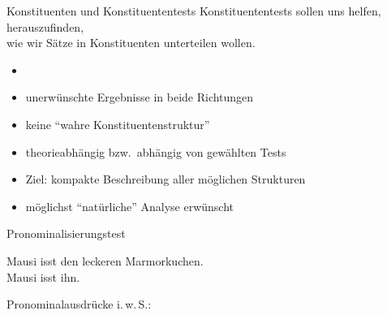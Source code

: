 \begin{frame}
  {Konstituenten und Konstituententests}
  \pause
  {\Large \alert{Konstituententests sollen uns helfen, herauszufinden,\\
  wie wir Sätze in Konstituenten unterteilen wollen.}}\\
  \Zeile
  \pause
  \pause
  \Halbzeile
  \begin{itemize}[<+->]
    \item {}
    \item unerwünschte Ergebnisse in beide Richtungen
    \item keine "`wahre Konstituentenstruktur"'
    \item theorieabhängig bzw.\ abhängig von gewählten Tests
    \Zeile
    \item Ziel: kompakte Beschreibung aller möglichen Strukturen
    \item möglichst "`natürliche"' Analyse erwünscht
  \end{itemize}
\end{frame}

\begin{frame}
  {Pronominalisierungstest}
  \pause
  \begin{exe}
    \ex Mausi isst \alert<3->{den leckeren Marmorkuchen}.\\
    \pause
       Mausi isst \alert{ihn}.
    \pause
    \pause
  \end{exe}
  \pause
  \Halbzeile
  Pronominalausdrücke i.\,w.\,S.:
  \begin{exe}
      \pause
      \pause
  \end{exe}
\end{frame}

